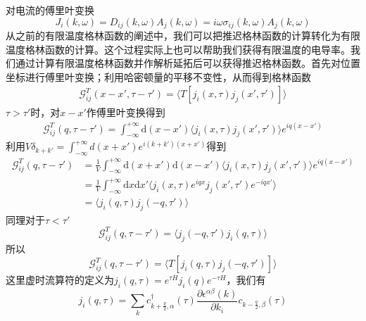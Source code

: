 \documentclass{article}
\numberwithin{equation}{subsection}
\begin{document}
对电流的傅里叶变换
\begin{equation}
    J_i(k,\omega)=D_{ij}(k,\omega)A_j(k,\omega)=i\omega\sigma_{ij}(k,\omega)A_j(k,\omega)
\end{equation}
从之前的有限温度格林函数的阐述中，我们可以把推迟格林函数的计算转化为有限温度格林函数的计算。这个过程实际上也可以帮助我们获得有限温度的电导率。我们通过计算有限温度格林函数并作解析延拓后可以获得推迟格林函数。首先对位置坐标进行傅里叶变换；利用哈密顿量的平移不变性，从而得到格林函数
\begin{equation}
    \begin{split}
        \mathcal{G}_{ij}^T(x-x',\tau-\tau')=\langle T[j_i(x,\tau)j_j(x',\tau')]\rangle
    \end{split}
\end{equation}
$\tau>\tau'$时，对$x-x'$作傅里叶变换得到
\begin{equation}
    \begin{split}
        \mathcal{G}_{ij}^T(q,\tau-\tau')=\int_{-\infty}^{+\infty}\mathrm{d}(x-x')\langle j_i(x,\tau)j_j(x',\tau')\rangle e^{iq(x-x')}
    \end{split}
\end{equation}
利用$V\delta_{k+k'}=\int_{-\infty}^{+\infty}d(x+x')e^{i(k+k')(x+x')}$得到
\begin{equation}
    \begin{split}
        \mathcal{G}_{ij}^T(q,\tau-\tau')&=\frac{1}{V}\int_{-\infty}^{+\infty}\mathrm{d}(x+x')\mathrm{d}(x-x')\langle j_i(x,\tau)j_j(x',\tau')\rangle e^{iq(x-x')}\\
        &=\frac{1}{V}\int_{-\infty}^{+\infty}\mathrm{d}x\mathrm{d}x'\langle j_i(x,\tau)e^{iqx}j_j(x',\tau')e^{-iqx'}\rangle\\
        &=\langle j_i(q,\tau)j_j(-q,\tau')\rangle
    \end{split}
\end{equation}
同理对于$\tau<\tau'$
\begin{equation}
    \mathcal{G}_{ij}^T(q,\tau-\tau')=\langle j_j(-q,\tau')j_i(q,\tau)\rangle
\end{equation}
所以
\begin{equation}
    \mathcal{G}_{ij}^T(q,\tau-\tau')=\langle T[j_i(q,\tau)j_j(-q,\tau')]\rangle
\end{equation}
这里虚时流算符的定义为$j_i(q,\tau)=e^{\tau H}j_i(q)e^{-\tau H}$，我们有
\begin{equation}
    j_i(q,\tau)=\sum_{k}c_{k+\frac{q}{2},\alpha}^\dagger(\tau)\frac{\partial \epsilon^{\alpha\beta}(k)}{\partial k_i}c_{k-\frac{q}{2},\beta}(\tau)
\end{equation}
\end{document}

